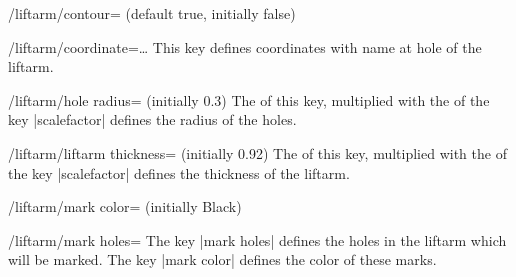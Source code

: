 \documentclass[a4paper,english,dvipsnames]{ltxdoc}
\begin{document}
\begin{command}{\liftarm{}}
\begin{key}{/liftarm/contour= (default true, initially false)}
\begin{codeexample}[width=10cm]
\end{codeexample}
\end{key}
\begin{key}{/liftarm/coordinate=\dots}
This key defines coordinates with name  at hole  of the liftarm.
\begin{codeexample}[width=10cm]
\end{codeexample}
\end{key}
\begin{key}{/liftarm/hole radius= (initially 0.3)}
The  of this key, multiplied with the  of the key |scalefactor| defines the radius of the holes.
\begin{codeexample}[width=10cm]
\end{codeexample}
\end{key}
\begin{key}{/liftarm/liftarm thickness= (initially 0.92)}
The  of this key, multiplied with the  of the key |scalefactor| defines the thickness of the liftarm.
\begin{codeexample}[width=10cm]
\end{codeexample}
\end{key}
\begin{key}{/liftarm/mark color= (initially Black)}
\end{key}
\begin{key}{/liftarm/mark holes=}
The key |mark holes| defines the holes in the liftarm which will be marked. The key |mark color| defines the color of these marks.
\begin{codeexample}[width=10cm]
\end{codeexample}
\end{key}

\end{command}
\end{document}
